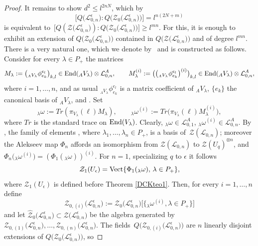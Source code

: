 \documentclass[pdftex]{sigma}
\numberwithin{equation}{section}
\theoremstyle{definition}
\newcommand{\e}{\epsilon}
\newcommand{\Ll}{{\mathcal L}}
\begin{document}
\begin{proof}
It remains to show $d^2\leq l^{2nN}$, which by \[\bigl[Q\bigl(\Ll_{0,n}^\e\bigr):Q\bigl(\mathcal{Z}_0\bigl(\Ll_{0,n}^\e\bigr)\bigr)\bigr]= l^{n(2N+m)}\] is equivalent to~${\bigl[Q(\mathcal{Z}\bigl(\Ll_{0,n}^\e\bigr)):Q\bigl(\mathcal{Z}_0\bigl(\Ll_{0,n}^\e\bigr)\bigr)\bigr] \geq l^{mn}}$. For this, it is enough to exhibit an extension of $Q\bigl(\mathcal{Z}_0\bigl(\Ll_{0,n}^\e\bigr)\bigr)$ contained in $Q\bigl(\mathcal{Z}\bigl(\Ll_{0,n}^\e\bigr)\bigr)$ and of degree $l^{mn}$. There is a very natural one, which we denote by~\smash{$Q\big(\hat{\mathcal{Z}}_{0}\bigl(\Ll_{0,n}^\e\bigr)\big)$} and is constructed as follows. Consider for every $\lambda\in P_+$ the matrices
\[
M_\lambda:=\bigl({}_{{}_AV_{\lambda}}\phi_{e_k}^{e_l}\bigr)_{k,l}\in {\rm End}({}_AV_{\lambda})\otimes\Ll_{0,n}^A,\qquad M_\lambda^{(i)}:=\big(\bigl({}_{{}_AV_{\lambda}}\phi_{e_k}^{e_l}\bigr)^{(i)}\big)_{k,l}\in {\rm End}({}_AV_{\lambda})\otimes\Ll_{0,n}^A,
\]
where $i=1,\dots,n$, and as usual ${}_{{}_AV_{\lambda}}\phi_{e_k}^{e_l}$ is a matrix coefficient of ${}_AV_{\lambda}$, $\{e_k\}$ the canonical basis of ${}_AV_{\lambda}$, and . Set
\[
{}_{\lambda}\omega := Tr(\pi_{V_{\lambda}}(\ell)M_\lambda),\qquad {}_{\lambda}\omega^{(i)} := Tr\big(\pi_{V_{\lambda}}(\ell)M_\lambda^{(i)}\big),
\]
where $Tr$ is the standard trace on ${\rm End}(V_{\lambda})$. Clearly, ${}_{\lambda}\omega\in \Ll_{0,1}^A$, ${}_{\lambda}\omega^{(i)}\in \Ll_{0,n}^A$. By \cite[Propositions~4.8 and~6.24]{BR}, the family of elements , where $\lambda_1,\dots, \lambda_n\in P_+$, is a basis of~$\mathcal{Z}(\Ll_{0,n})$; moreover the Alekseev map $\Phi_n$ affords an isomorphism from $\mathcal{Z}(\Ll_{0,n})$ to $\mathcal{Z}(U_q)^{\otimes n}$, and $\Phi_n\big({}_{\lambda}\omega^{(i)}\big) = (\Phi_1({}_{\lambda}\omega))^{(i)}$. For $n=1$, specializing $q$ to $\e$ it follows
\begin{equation}\label{Z1omegalambda}
\mathcal{Z}_1(U_\e) = {\rm Vect} \lbrace \Phi_1({}_{\lambda}\omega), \, \lambda\in P_+ \rbrace ,
\end{equation}
where $\mathcal{Z}_1(U_\e)$ is defined before Theorem \ref{DCKteo1}. Then, for every $i=1,\dots,n$ define
\[\mathcal{Z}_{0,(i)}\bigl(\Ll_{0,n}^\e\bigr) := \mathcal{Z}_0\bigl(\Ll_{0,n}^\e\bigr)\big[\big\{{}_{\lambda}\omega^{(i)},\lambda\in P_+\big\}\big]
\]
and let $\hat{\mathcal{Z}}_{0}\bigl(\Ll_{0,n}^\e\bigr)\subset \mathcal{Z}\bigl(\Ll_{0,n}^\e\bigr)$ be the algebra generated by $\mathcal{Z}_{0,(1)}\bigl(\Ll_{0,n}^\e\bigr),\dots,\mathcal{Z}_{0,(n)}\bigl(\Ll_{0,n}^\e\bigr)$. The fields~${Q\bigl(\mathcal{Z}_{0,(i)}\bigl(\Ll_{0,n}^\e\bigr)\bigr)}$ are $n$ linearly disjoint extensions of $Q\bigl(\mathcal{Z}_0\bigl(\Ll_{0,n}^\e\bigr)\bigr)$, so

\end{proof}
\end{document}

